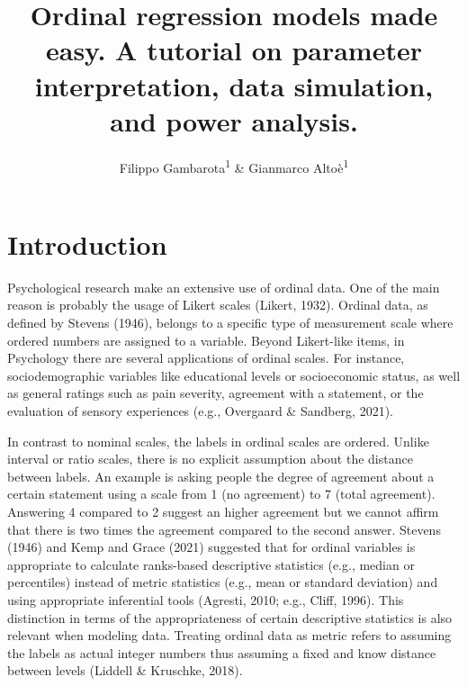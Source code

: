 \documentclass[
  man,floatsintext]{apa6}
\title{Ordinal regression models made easy. A tutorial on parameter interpretation, data simulation, and power analysis.}
\author{Filippo Gambarota\textsuperscript{1} \& Gianmarco Altoè\textsuperscript{1}}
\date{}
\affiliation{\vspace{0.5cm}\textsuperscript{1} Department of Developmental Psychology and Socialization, University of Padova, Italy}
\begin{document}
\maketitle

\scriptsize

\normalsize

\scriptsize

\normalsize

\section{Introduction}\label{introduction}

Psychological research make an extensive use of ordinal data. One of the main reason is probably the usage of Likert scales (Likert, 1932). Ordinal data, as defined by Stevens (1946), belongs to a specific type of measurement scale where ordered numbers are assigned to a variable. Beyond Likert-like items, in Psychology there are several applications of ordinal scales. For instance, sociodemographic variables like educational levels or socioeconomic status, as well as general ratings such as pain severity, agreement with a statement, or the evaluation of sensory experiences (e.g., Overgaard \& Sandberg, 2021).

In contrast to nominal scales, the labels in ordinal scales are ordered. Unlike interval or ratio scales, there is no explicit assumption about the distance between labels. An example is asking people the degree of agreement about a certain statement using a scale from 1 (no agreement) to 7 (total agreement). Answering 4 compared to 2 suggest an higher agreement but we cannot affirm that there is two times the agreement compared to the second answer. Stevens (1946) and Kemp and Grace (2021) suggested that for ordinal variables is appropriate to calculate ranks-based descriptive statistics (e.g., median or percentiles) instead of metric statistics (e.g., mean or standard deviation) and using appropriate inferential tools (Agresti, 2010; e.g., Cliff, 1996). This distinction in terms of the appropriateness of certain descriptive statistics is also relevant when modeling data. Treating ordinal data as metric refers to assuming the labels as actual integer numbers thus assuming a fixed and know distance between levels (Liddell \& Kruschke, 2018).
\end{document}

